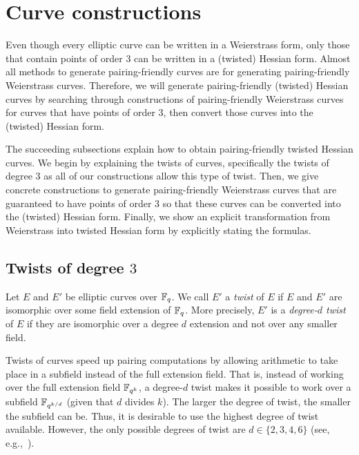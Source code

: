 \section{Curve constructions}
\label{sec:curves}

Even though every elliptic curve can be written in a Weierstrass form,
only those that contain points of order 3 can be written in a (twisted) Hessian form.
Almost all methods to generate pairing-friendly curves are for generating
pairing-friendly Weierstrass curves.
Therefore, we will generate pairing-friendly (twisted) Hessian curves by
searching through constructions of pairing-friendly Weierstrass curves for curves that have points of order 3,
then convert those curves into the (twisted) Hessian form.

The succeeding subsections explain how to obtain pairing-friendly twisted Hessian curves.
We begin by explaining the twists of curves, specifically the twists of degree $3$
as all of our constructions allow this type of twist.
Then, we give concrete constructions to generate pairing-friendly Weierstrass curves that are guaranteed to have points of order 3
so that these curves can be converted into the (twisted) Hessian form.
Finally, we show an explicit transformation from Weierstrass into twisted Hessian form by explicitly stating the formulas.


\subsection{Twists of degree $3$}
\label{twist}
Let $E$ and $E'$ be elliptic curves over $\mathbb{F}_{q}$.
We call $E'$ a \emph{twist} of $E$ if $E$ and $E'$ are isomorphic over some field extension of $\mathbb{F}_{q}$.
More precisely, $E'$ is a {\emph{degree-$d$ twist}} of $E$ if they are isomorphic over a degree $d$ extension and not over any smaller field.

Twists of curves speed up pairing computations by allowing arithmetic to take place in a subfield instead of the full extension field.
That is, instead of working over the full extension field $\mathbb{F}_{q^k}$, a degree-$d$ twist makes it possible to work over a subfield $\mathbb{F}_{q^{k/d}}$
(given that $d$ divides $k$).
The larger the degree of twist, the smaller the subfield can be.
Thus, it is desirable to use the highest degree of twist available.
However, the only possible degrees of twist are $d \in \{2,3,4,6\}$ (see, e.g.,~\cite{2009/silverman-arithmetic}).

